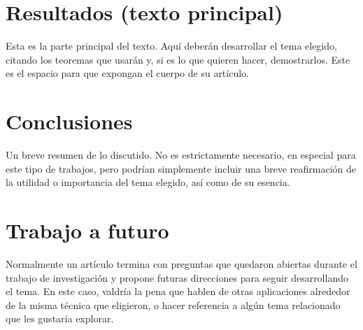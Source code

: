 \documentclass[letterpaper,12pt]{article}
\begin{document}
\section{Resultados (texto principal)}

Esta es la parte principal del texto. Aquí deberán desarrollar el tema elegido, citando los teoremas que usarán y, si es lo que quieren hacer, demostrarlos. Este es el espacio para que expongan el cuerpo de su artículo.

\section{Conclusiones}

Un breve resumen de lo discutido. No es estrictamente necesario, en especial para este tipo de trabajos, pero podrían simplemente incluir una breve reafirmación de la utilidad o importancia del tema elegido, así como de su esencia. 


\section{Trabajo a futuro}

Normalmente un artículo termina con preguntas que quedaron abiertas durante el trabajo de investigación y propone futuras direcciones para seguir desarrollando el tema. En este caso, valdría la pena que hablen de otras aplicaciones alrededor de la misma técnica que eligieron, o hacer referencia a algún tema relacionado que les gustaría explorar.
\end{document}
